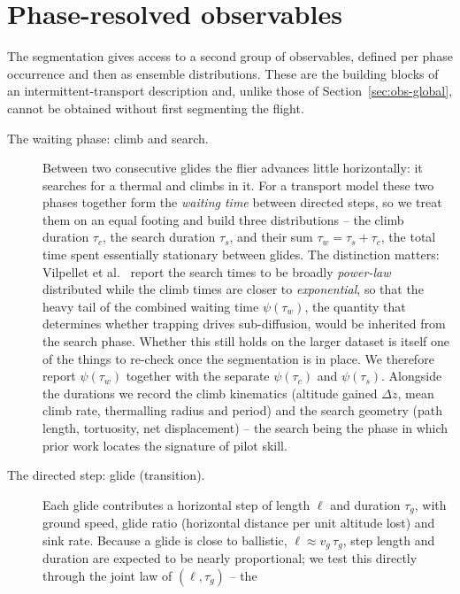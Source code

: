\section{Phase-resolved observables}
\label{sec:phaseobs}
The segmentation gives access to a second group of observables, defined per phase occurrence and
then as ensemble distributions. These are the building blocks of an intermittent-transport
description and, unlike those of Section~\ref{sec:obs-global}, cannot be obtained without
first segmenting the flight.
\begin{description}
  \item[The waiting phase: climb and search.] Between two consecutive glides the flier
        advances little horizontally: it searches for a thermal and climbs in it. For a
        transport model these two phases together form the \emph{waiting time} between
        directed steps, so we treat them on an equal footing and build three distributions --
        the climb duration $\tau_c$, the search duration $\tau_s$, and their sum
        $\tau_w=\tau_s+\tau_c$, the total time spent essentially stationary between glides.
        The distinction matters: Vilpellet et al.~\cite{vilpellet2026} report the
        search times to be broadly \emph{power-law} distributed while the climb times are
        closer to \emph{exponential}, so that the heavy tail of the combined waiting time
        $\psi(\tau_w)$, the quantity that determines whether trapping drives
        sub-diffusion, would be inherited from the search phase. Whether this still holds on
        the larger dataset is itself one of the things to re-check once the segmentation is in
        place. We therefore report $\psi(\tau_w)$ together with the separate $\psi(\tau_c)$ and
        $\psi(\tau_s)$. Alongside the durations we record the climb kinematics (altitude gained
        $\Delta z$, mean climb rate, thermalling radius and period) and the search geometry
        (path length, tortuosity, net displacement) -- the search being the phase in which
        prior work locates the signature of pilot skill.
  \item[The directed step: glide (transition).] Each glide contributes a horizontal step of
        length $\ell$ and duration $\tau_g$, with ground speed, glide ratio (horizontal
        distance per unit altitude lost) and sink rate. Because a glide is close to ballistic,
        $\ell\approx v_g\,\tau_g$, step length and duration are expected to be nearly
        proportional; we test this directly through the joint law of $(\ell,\tau_g)$ -- the

\end{description}
